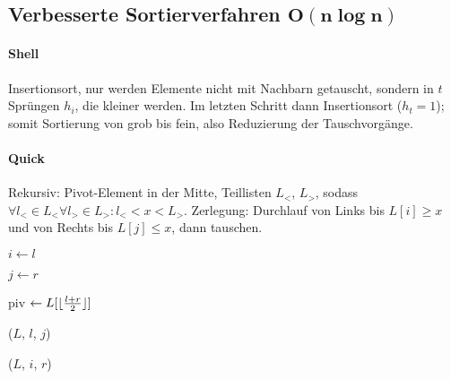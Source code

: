 \subsection{Verbesserte Sortierverfahren $\mathbf{O(n \log n)}$}

\paragraph{Shell}
Insertionsort, nur werden Elemente nicht mit Nachbarn getauscht, sondern in $t$ Sprüngen $h_i$, die kleiner werden. Im letzten Schritt dann Insertionsort ($h_t = 1$); somit Sortierung von grob bis fein, also Reduzierung der Tauschvorgänge.

\begin{algorithm}[H]


\end{algorithm}

\paragraph{Quick}
Rekursiv: Pivot-Element in der Mitte, Teillisten $L_<$, $L_>$, sodass $\forall l_< \in L_< \forall l_> \in L_>: l_< < x < L_>$. Zerlegung: Durchlauf von Links bis $L[i] \geq x$ und von Rechts bis $L[j] \leq x$, dann tauschen.


\begin{algorithm}[H]



  $i \leftarrow l$

  $j \leftarrow r$

  piv $\leftarrow L[\lfloor \frac{l + r}{2} \rfloor]$


  \Quicksort($L$, $l$, $j$)

  \Quicksort($L$, $i$, $r$)
\end{algorithm}

